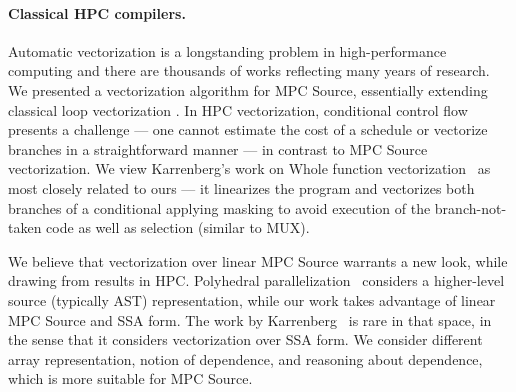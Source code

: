 \paragraph{Classical HPC compilers.}
Automatic vectorization is a longstanding problem in high-performance computing and
there are thousands of works reflecting many years of research. We presented a vectorization
algorithm for MPC Source, essentially extending classical loop vectorization \cite{Allen:1987}. In HPC vectorization, conditional control flow
presents a challenge --- one cannot estimate the cost of a schedule or vectorize branches in a straightforward manner --- in contrast to
MPC Source vectorization.
We view Karrenberg's work on Whole function vectorization~\cite{Karrenberg:2015} as most closely related to ours --- it linearizes the program and vectorizes
both branches of a conditional applying masking to avoid execution of the branch-not-taken code as well as selection (similar to MUX). 

We believe that vectorization over linear MPC Source warrants a new look, while drawing from
results in HPC.
Polyhedral parallelization~\cite{Benabderrahmane:2010} considers a higher-level source (typically AST)
representation, while our work takes advantage of linear MPC Source and SSA form. The work by Karrenberg~\cite{Karrenberg:2015} is rare in that space, in the sense that it considers
vectorization over SSA form. %
We consider different array representation, notion of dependence, and reasoning
about dependence, which is more suitable for MPC Source. 
